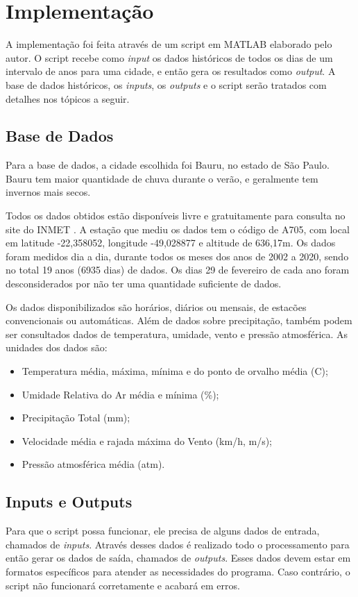 \chapter{Implementação}
\label{c.implementacao}
A implementação foi feita através de um script em MATLAB elaborado pelo autor. O script recebe como \emph{input} os dados históricos de todos os dias de um intervalo de anos para uma cidade, e então gera os resultados como \emph{output}. A base de dados históricos, os \emph{inputs}, os \emph{outputs} e o script serão tratados com detalhes nos tópicos a seguir.

\section{Base de Dados}
\label{s.basedados}
Para a base de dados, a cidade escolhida foi Bauru, no estado de São Paulo. Bauru tem maior quantidade de chuva durante o verão, e geralmente tem invernos mais secos.

Todos os dados obtidos estão disponíveis livre e gratuitamente para consulta no site do INMET \cite{inmet}. A estação que mediu os dados tem o código de A705, com local em latitude -22,358052, longitude -49,028877 e altitude de 636,17m. Os dados foram medidos dia a dia, durante todos os meses dos anos de 2002 a 2020, sendo no total 19 anos (6935 dias) de dados. Os dias 29 de fevereiro de cada ano foram desconsiderados por não ter uma quantidade suficiente de dados. 

Os dados disponibilizados são horários, diários ou mensais, de estacões convencionais ou automáticas. Além de dados sobre precipitação, também podem ser consultados dados de temperatura, umidade, vento e pressão atmosférica. As unidades dos dados são:
\begin{itemize}
    \item Temperatura média, máxima, mínima e do ponto de orvalho média (\degree C);
    \item Umidade Relativa do Ar média e mínima (\%);
    \item Precipitação Total (mm);
    \item Velocidade média e rajada máxima do Vento (km/h, m/s);
    \item Pressão atmosférica média (atm).
\end{itemize}

\section{Inputs e Outputs}
\label{s.io}
Para que o script possa funcionar, ele precisa de alguns dados de entrada, chamados de \emph{inputs}. Através desses dados é realizado todo o processamento para então gerar os dados de saída, chamados de \emph{outputs}.
Esses dados devem estar em formatos específicos para atender as necessidades do programa. Caso contrário, o script não funcionará corretamente e acabará em erros.

